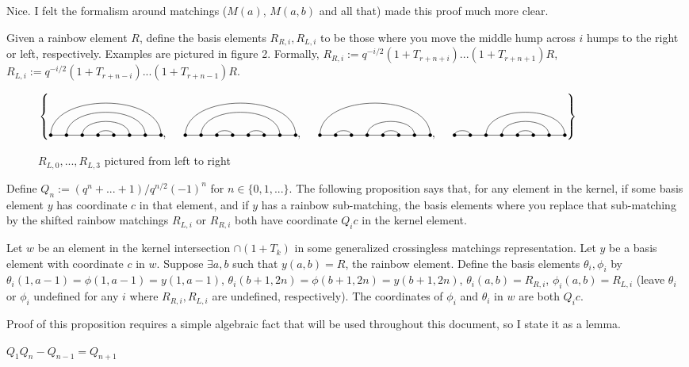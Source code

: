 \documentclass{amsart}
\begin{document}
{\color{magenta} Nice. I felt the formalism around matchings ($M(a)$, $M(a,b)$ and all that) made this proof much more clear.}

Given a rainbow element $R$, define the basis elements $R_{R,i},R_{L,i}$ to be those where you move the middle hump across $i$ humps to the right or left, respectively. Examples are pictured in figure 2. Formally, $R_{R,i}:=q^{-i/2}(1+T_{r+n+i})...(1+T_{r+n+1})R$, $R_{L,i}:=q^{-i/2}(1+T_{r+n-i})...(1+T_{r+n-1})R$.

\begin{figure}
		\def\cbasisspacing{5mm}
	$\cbr{
		\begin{gathered}
		\Matching{8}{1/8, 2/7, 3/6, 4/5}, \hspace{\cbasisspacing}
		\Matching{8}{1/8, 2/7, 3/4, 5/6}, \hspace{\cbasisspacing}
		\Matching{8}{1/8, 2/3, 4/7, 5/6}, \hspace{\cbasisspacing}
		\Matching{8}{1/2,3/8,4/7,5/6}
		\end{gathered}}$
	\caption{$R_{L,0},...,R_{L,3}$ pictured from left to right}
\end{figure}

 Define $Q_n:=(q^n+...+1)/q^{n/2}(-1)^n$ for $n\in \{0,1,...\}$. The following proposition says that, for any element in the kernel, if some basis element $y$ has coordinate $c$ in that element, and if $y$ has a rainbow sub-matching, the basis elements where you replace that sub-matching by the shifted rainbow matchings $R_{L,i}$ or $R_{R,i}$ both have coordinate $Q_ic$ in the kernel element.
 
\begin{proposition}
	Let $w$ be an element in the kernel intersection $\cap (1+T_k)$ in some generalized crossingless matchings representation. Let $y$ be a basis element with coordinate $c$ in $w$. Suppose $\exists a,b$ such that $y(a,b)=R$, the rainbow element. Define the basis elements $\theta_i,\phi_i$ by $\theta_i(1,a-1)=\phi(1,a-1)=y(1,a-1)$, $\theta_i(b+1,2n)=\phi(b+1,2n)=y(b+1,2n)$, $\theta_i(a,b)=R_{R,i}$, $\phi_i(a,b)=R_{L,i}$ (leave $\theta_i$ or $\phi_i$ undefined for any $i$ where $R_{R,i},R_{L,i}$ are undefined, respectively). The coordinates of $\phi_i$ and $\theta_i$ in $w$ are both $Q_ic$.
\end{proposition}


Proof of this proposition requires a simple algebraic fact that will be used throughout this document, so I state it as a lemma.

\begin{lemma}
	$Q_1Q_n-Q_{n-1}=Q_{n+1}$
\end{lemma}
\end{document}
